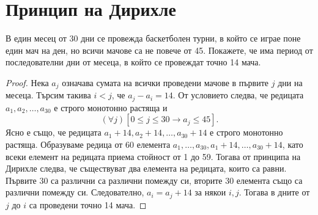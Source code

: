  



\section{Принцип на Дирихле}
\begin{problem}%
  В един месец от 30 дни се провежда баскетболен турни, в който се играе поне един мач на ден, но всичи мачове са не повече от 45.
  Покажете, че има период от последователни дни от месеца, в който се провеждат точно 14 мача.
\end{problem}
\begin{proof}
  Нека $a_j$ означава сумата на всички проведени мачове в първите $j$ дни на месеца.
  Търсим такива $i<j$, че $a_j - a_i = 14$.
  От условието следва, че редицата $a_1,a_2,\dots, a_{30}$ е строго монотонно растяща и
  \[(\forall j)[0\leq j\leq 30 \rightarrow a_j \leq 45].\]
  Ясно е също, че редицата $a_1+14,a_2+14,\dots,a_{30}+14$ е строго монотонно растяща.
  Образуваме редица от 60 елемента $a_1,\dots,a_{30},a_1+14,\dots,a_{30}+14$, като 
  всеки елемент на редицата приема стойност от 1 до 59.
  Тогава от принципа на Дирихле следва, че съществуват два елемента на редицата, които са равни.
  Първите 30 са различни са различни помежду си, вторите 30 елемента също са различни помежду си.
  Следователно, $a_i = a_j + 14$ за някои $i,j$.
  Тогава в дните от $j$ до $i$ са проведени точно 14 мача.
\end{proof}

